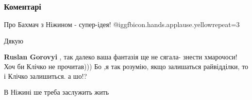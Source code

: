  
 
 
 
 
\subsubsection{Коментарі}

\begin{itemize}
 
Про Бахмач з Ніжином - супер-ідея!  @igg{fbicon.hands.applause.yellow}{repeat=3} 

 
Дякую

 
\textbf{Ruslan Gorovyi} , так далеко ваша фантазія ще не сягала- знести хмарочоси!
Хоч би Клічко не прочитав))) Бо ,я так розумію, якщо залишаться райвідділки, то і Клічко залишиться. а шо!?

 
В Ніжині ше треба заслужить жить

 

\end{itemize}
